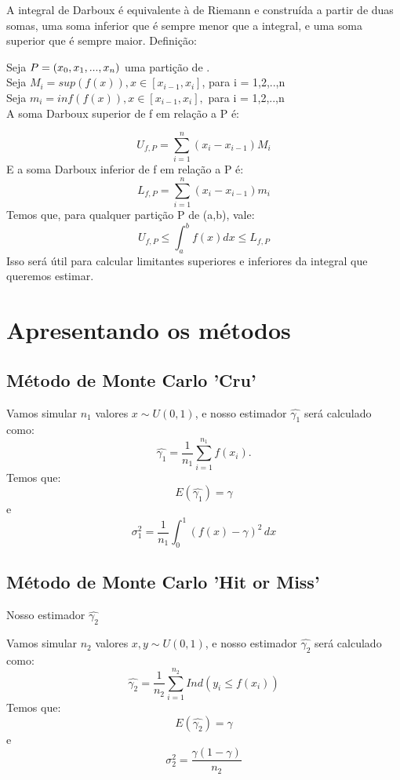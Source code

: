 \documentclass{article}
\begin{document}
A integral de Darboux é equivalente à de Riemann e construída a partir de duas somas, uma soma inferior que é sempre menor que a integral, e uma soma superior que é sempre maior. Definição: 

Seja $P = \left(x_0, x_1,..., x_n\right)$ uma partição de . 
\\
Seja $M_i = sup(f(x)), x \in [x_{i-1}, x_i]$, para i = 1,2,..,n \\
Seja $m_i = inf(f(x)), x \in [x_{i-1}, x_i],$ para i = 1,2,..,n \\
A soma Darboux superior de f em relação a P é: 

\[
U_{f,P} = \sum_{i=1}^{n} (x_i - x_{i-1})M_i 
\]
E a soma Darboux inferior de f em relação a P é:
\[
L_{f,P} = \sum_{i=1}^{n} (x_i - x_{i-1})m_i 
\]
Temos que, para qualquer partição P de (a,b), vale:
\[
U_{f,P} \leq \int_{a}^{b} f(x)dx \leq  L_{f,P}
\]
Isso será útil para calcular limitantes superiores e inferiores da integral que queremos estimar.

\section{Apresentando os métodos}
\subsection{Método de Monte Carlo 'Cru'}
Vamos simular $n_1$ valores $x \sim U(0,1)$, e nosso estimador $\widehat{\gamma_1}$ será calculado como:
\[
\widehat{\gamma_1} = \frac{1}{n_1} \sum_{i=1}^{n_1} f(x_i).
\]
Temos que:
\[ 
E(\widehat{\gamma_1}) = \gamma
\] 
e
\[
\sigma^2_1 = \frac{1}{n_1} \int_{0}^{1} (f(x) - \gamma)^2 \,dx 
\]


\subsection{Método de Monte Carlo 'Hit or Miss'}
Nosso estimador $\widehat{\gamma_2}$

Vamos simular $n_2$ valores $x,y \sim U(0,1)$, e nosso estimador $\widehat{\gamma_2}$ será calculado como:
\[
\widehat{\gamma_2} = \frac{1}{n_2} \sum_{i=1}^{n_2} Ind(y_i \leq f(x_i))
\]
Temos que:
\[ 
E(\widehat{\gamma_2}) = \gamma
\] 
e
\[
\sigma^2_2 = \frac{\gamma(1 - \gamma)}{n_2} 
\]
\end{document}
